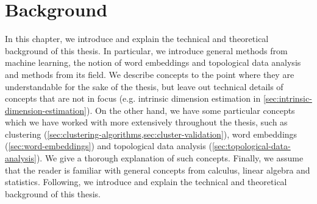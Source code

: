 \chapter{Background}
In this chapter, we introduce and explain the technical and theoretical background of this thesis. In particular, we introduce general methods from machine learning, the notion of word embeddings and topological data analysis and methods from its field. We describe concepts to the point where they are understandable for the sake of the thesis, but leave out technical details of concepts that are not in focus (e.g. intrinsic dimension estimation in \cref{sec:intrinsic-dimension-estimation}). On the other hand, we have some particular concepts which we have worked with more extensively throughout the thesis, such as clustering (\cref{sec:clustering-algorithms,sec:cluster-validation}), word embeddings (\cref{sec:word-embeddings}) and topological data analysis (\cref{sec:topological-data-analysis}). We give a thorough explanation of such concepts. Finally, we assume that the reader is familiar with general concepts from calculus, linear algebra and statistics. Following, we introduce and explain the technical and theoretical background of this thesis.



